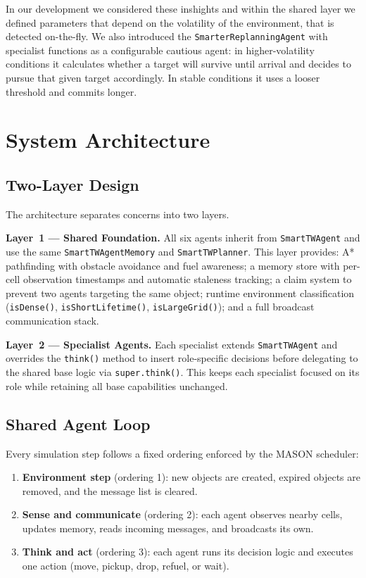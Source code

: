 \documentclass[letterpaper]{article}
\begin{document}
In our development we considered these inshights and within the shared layer we defined 
parameters that depend on the volatility of the environment, that is detected on-the-fly. 
We also introduced the \texttt{SmarterReplanningAgent} with specialist functions as a configurable 
cautious agent: in higher-volatility conditions it calculates whether a target will survive until 
arrival and decides to pursue that given target accordingly. In stable conditions it uses a looser
 threshold and commits longer.

\section{System Architecture}

\subsection{Two-Layer Design}

The architecture separates concerns into two layers.

\textbf{Layer~1 --- Shared Foundation.}
All six agents inherit from \texttt{SmartTWAgent} and use the same
\texttt{SmartTWAgentMemory} and \texttt{SmartTWPlanner}. This layer provides:
A* pathfinding with obstacle avoidance and fuel awareness;
a memory store with per-cell observation timestamps and automatic staleness
tracking;
a claim system to prevent two agents targeting the same object;
runtime environment classification (\texttt{isDense()},
\texttt{isShortLifetime()}, \texttt{isLargeGrid()});
and a full broadcast communication stack.

\textbf{Layer~2 --- Specialist Agents.}
Each specialist extends \texttt{SmartTWAgent} and overrides the \texttt{think()}
method to insert role-specific decisions before delegating to the shared base
logic via \texttt{super.think()}. This keeps each specialist focused on its role
while retaining all base capabilities unchanged.

\subsection{Shared Agent Loop}

Every simulation step follows a fixed ordering enforced by the MASON scheduler:

\begin{enumerate}
\item \textbf{Environment step} (ordering 1): new objects are created, expired
objects are removed, and the message list is cleared.
\item \textbf{Sense and communicate} (ordering 2): each agent observes nearby
cells, updates memory, reads incoming messages, and broadcasts its own.
\item \textbf{Think and act} (ordering 3): each agent runs its decision logic
and executes one action (move, pickup, drop, refuel, or wait).
\end{enumerate}
\end{document}
